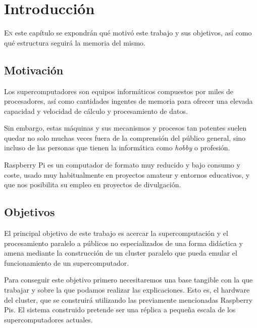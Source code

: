 \chapter{Introducción}
\label{chap:introducion}

\lettrine{E}{n} este capítulo se expondrán qué motivó este trabajo y sus objetivos, así como qué estructura seguirá la memoria del mismo.





\section{Motivación}
\label{sec:motivacion}

Los supercomputadores son equipos informáticos compuestos por miles de procesadores, así como cantidades ingentes de memoria para ofrecer una elevada capacidad y velocidad de cálculo y procesamiento de datos.

Sin embargo, estas máquinas y sus mecanismos y procesos tan potentes suelen quedar no solo muchas veces fuera de la comprensión del público general, sino incluso de las personas que tienen la informática como \textit{hobby} o profesión.

Raspberry Pi es un computador de formato muy reducido y bajo consumo y coste, usado muy habitualmente en proyectos amateur y entornos educativos, y que nos posibilita su empleo en proyectos de divulgación. 

\section{Objetivos}
\label{sec:objetivos}

El principal objetivo de este trabajo es acercar la supercomputación y el procesamiento paralelo a públicos no especializados de una forma didáctica y amena mediante la construcción de un cluster paralelo que pueda emular el funcionamiento de un supercomputador.

Para conseguir este objetivo primero necesitaremos una base tangible con la que trabajar y sobre la que podamos realizar las explicaciones. Esto es, el hardware del cluster, que se construirá utilizando las previamente mencionadas Raspberry Pis. El sistema construido pretende ser una réplica a pequeña escala de los supercomputadores actuales.

